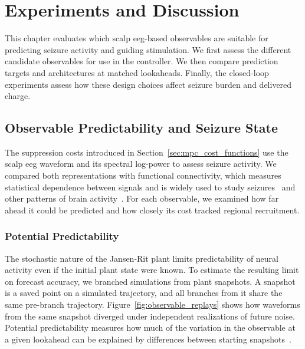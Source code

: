 \chapter{Experiments and Discussion}\label{ch:experiments_discussion}

This chapter evaluates which scalp \ac{eeg}-based observables are suitable for predicting seizure activity and guiding stimulation.
We first assess the different candidate observables for use in the controller.
We then compare prediction targets and architectures at matched lookaheads.
Finally, the closed-loop experiments assess how these design choices affect seizure burden and delivered charge.

\section{Observable Predictability and Seizure State}\label{sec:observable_predictability}

The suppression costs introduced in Section~\ref{sec:mpc_cost_functions} use the scalp \ac{eeg} waveform and its spectral log-power to assess seizure activity.
We compared both representations with functional connectivity, which measures statistical dependence between signals and is widely used to study seizures~\cite{Kramer2010,Liang2024} and other patterns of brain activity~\cite{Nolte2004,Roffet2025}.
For each observable, we examined how far ahead it could be predicted and how closely its cost tracked regional recruitment.

\subsection{Potential Predictability}

The stochastic nature of the Jansen-Rit plant limits predictability of neural activity even if the initial plant state were known.
To estimate the resulting limit on forecast accuracy, we branched simulations from plant snapshots.
A snapshot is a saved point on a simulated trajectory, and all branches from it share the same pre-branch trajectory.
Figure~\ref{fig:observable_replays} shows how waveforms from the same snapshot diverged under independent realizations of future noise.
Potential predictability measures how much of the variation in the observable at a given lookahead can be explained by differences between starting snapshots~\cite{Matsumura2010,Schubert2002}.

